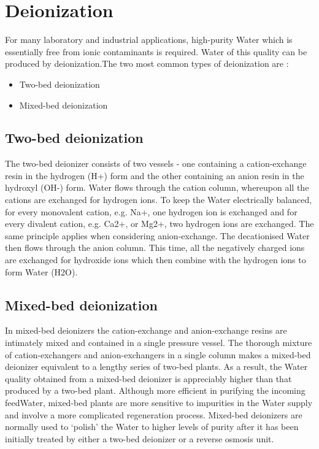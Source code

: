 \documentclass[english,11pt]{report}
\begin{document}
\section{Deionization}
For many laboratory and industrial applications, high-purity Water which is essentially free from ionic contaminants is required. Water of this quality can be produced by deionization.The two most common types of deionization are :
\begin{itemize}
    \item Two-bed deionization
    \item Mixed-bed deionization
\end{itemize}
\subsection{Two-bed deionization}
The two-bed deionizer consists of two vessels - one containing a cation-exchange resin in the hydrogen (H+) form and the other containing an anion resin in the hydroxyl (OH-) form. Water flows through the cation column, whereupon all the cations are exchanged for hydrogen ions. To keep the Water electrically balanced, for every monovalent cation, e.g. Na+, one hydrogen ion is exchanged and for every divalent cation, e.g. Ca2+, or Mg2+, two hydrogen ions are exchanged. The same principle applies when considering anion-exchange. The decationised Water then flows through the anion column. This time, all the negatively charged ions are exchanged for hydroxide ions which then combine with the hydrogen ions to form Water (H2O).

\subsection{Mixed-bed deionization}
In mixed-bed deionizers the cation-exchange and anion-exchange resins are intimately mixed and contained in a single pressure vessel. The thorough mixture of cation-exchangers and anion-exchangers in a single column makes a mixed-bed deionizer equivalent to a lengthy series of two-bed plants. As a result, the Water quality obtained from a mixed-bed deionizer is appreciably higher than that produced by a two-bed plant. Although more efficient in purifying the incoming feedWater, mixed-bed plants are more sensitive to impurities in the Water supply and involve a more complicated regeneration process. Mixed-bed deionizers are normally used to ‘polish' the Water to higher levels of purity after it has been initially treated by either a two-bed deionizer or a reverse osmosis unit.
\end{document}
